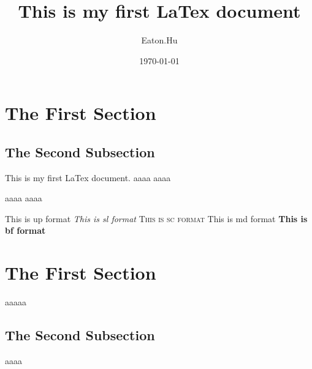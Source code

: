 \documentclass[12pt, a4paper, oneside]{article}
\title{This is my first LaTex document}
\author{Eaton.Hu}
\date{\today}
\begin{document}
\maketitle

\tableofcontents

\section{The First Section}

\subsection{The Second Subsection}

This is my first LaTex document.
aaaa
aaaa

aaaa
\newpage
aaaa

\textup{This is up format}
\textsl{This is sl format}
\textsc{This is sc format}
\textmd{This is md format}
\textbf{This is bf format}

\section{The First Section}
aaaaa
\subsection{The Second Subsection}
aaaa
\end{document}
